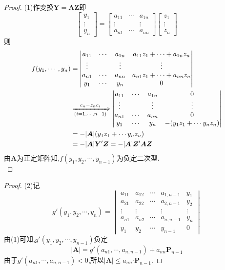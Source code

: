 \documentclass[lang=cn,11pt,normal]{elegantbook}
\begin{document}
		\begin{proof}
		(1)作变换$\boldsymbol{Y}=\boldsymbol{AZ}$即
		$$
		\begin{bmatrix}
		y_1\\\vdots\\y_n
		\end{bmatrix}
		=
		\begin{bmatrix}
		a_{11}&\cdots&a_{1n}\\
		\vdots&      &\vdots\\
		a_{n1}&\cdots&a_{nn}
		\end{bmatrix}
		\begin{bmatrix}
		z_1\\\vdots\\z_n
		\end{bmatrix}
		$$
		则
		$$
		\begin{aligned}
		f(y_1,\cdots,y_n)&=
		\begin{vmatrix}
		a_{11}&\cdots&a_{1n}&a_{11}z_1+\cdots+a_{1n}z_n\\
		\vdots&&\vdots&\vdots\\
		a_{n1}&\cdots&a_{nn}&a_{n1}z_1+\cdots+a_{nn}z_n\\
		y_1&\cdots&y_n&0
		\end{vmatrix}\\
		&\xRightarrow[(i=1,\cdots,n-1)]{c_n-z_nc_i}
		\begin{vmatrix}
		a_{11}&\cdots&a_{1n}&0\\
		\vdots&&\vdots&\vdots\\
		a_{n1}&\cdots&a_{nn}&0\\
		y_1&\cdots&y_n&-(y_1z_1+\cdots y_nz_n)
		\end{vmatrix}\\
		&=-|\boldsymbol{A}|(y_1z_1+\cdots y_nz_n)\\
		&=-|\boldsymbol{A}|\boldsymbol{Y}'\boldsymbol{Z}=-|\boldsymbol{A}|\boldsymbol{Z}'\boldsymbol{AZ}
		\end{aligned}
		$$
		由$\boldsymbol{A}$为正定矩阵知,$f(y_1,y_2,\cdots,y_{n-1})$为负定二次型.\\
	\end{proof}
	\begin{proof}
		(2)记
		$$
		g'(y_1,y_2,\cdots,y_n)=
		\begin{vmatrix}
		a_{11}&a_{12}&\cdots&a_{1,n-1}&y_1\\
		a_{21}&a_{22}&\cdots&a_{2,n-1}&y_2\\
		\vdots&\vdots&&\vdots&\vdots\\
		a_{n1}&a_{n2}&\cdots&a_{n,n-1}&y_n\\
		y_1&y_2&\cdots&y_{n-1}&0
		\end{vmatrix}
		$$
		由(1)可知,$g'(y_1,y_2,\cdots,y_{n-1})$负定
		$$
		|\boldsymbol{A}|=g'(a_{n1},\cdots,a_{n,n-1})+a_{nn}\boldsymbol{P}_{n-1}
		$$
		由于$g'(a_{n1},\cdots,a_{n,n-1})<0$,所以$|\boldsymbol{A}|\leq a_{nn}\boldsymbol{\cdot P}_{n-1}$.
	\end{proof}
\end{document}
